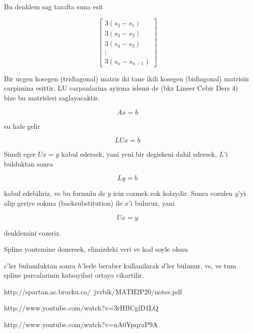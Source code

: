 \documentclass[12pt,fleqn]{article}\usepackage{common}
\begin{document}
Bu denklem sag tarafta suna esit 

\[ 
\left[\begin{array}{r}
3(s_2 - s_1) \\
3(s_3 - s_2) \\
3(s_4 - s_3) \\
\vdots \\
3(s_n - s_{n-1}) 
\end{array}\right]
 \]

Bir ucgen kosegen (tridiagonal) matris iki tane ikili kosegen (bidiagonal)
matrisin carpimina esittir. LU carpanlarina ayirma islemi de (bkz Lineer
Cebir Ders 4) bize bu matrisleri saglayacaktir. 

\[ Ax = b \]

su hale gelir

\[ LUx = b \]

Simdi eger $Ux = y$ kabul edersek, yani yeni bir degiskeni dahil edersek,
$L$'i bulduktan sonra

\[ Ly = b \]

kabul edebiliriz, ve bu formulu de $y$ icin cozmek cok kolaydir. Sonra
cozulen $y$'yi alip geriye sokma (backsubstitution) ile $x$'i buluruz, yani 

\[ Ux = y \]

denklemini cozeriz. 



Spline yontemine donersek, elimizdeki veri ve kod soyle olsun



$c$'ler bulunduktan sonra $h$'lerle beraber kullanilarak $d$'ler bulunur,
vs, ve tum spline parcalarinin katsayilari ortaya cikartilir.

http://spartan.ac.brocku.ca/~jvrbik/MATH2P20/notes.pdf

http://www.youtube.com/watch?v=3rHBCglD1LQ

http://www.youtube.com/watch?v=nA0YpqraP9A
\end{document}
